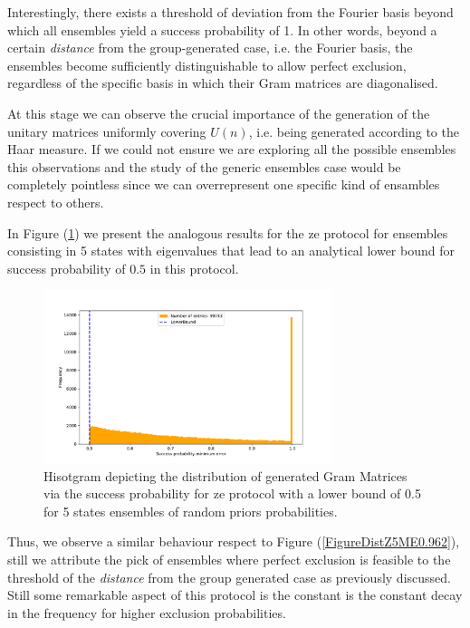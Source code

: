 \documentclass[12pt,letterpaper]{article}
\begin{document}
Interestingly, there exists a threshold of deviation from the Fourier basis beyond which all ensembles yield a success probability of 1. In other words, beyond a certain \emph{distance} from the group-generated case, i.e. the Fourier basis, the ensembles become sufficiently distinguishable to allow perfect exclusion, regardless of the specific basis in which their Gram matrices are diagonalised.

At this stage we can observe the crucial importance of the generation of the unitary matrices uniformly covering  $U(n)$, i.e. being generated according to the Haar measure. If we could not ensure we are exploring all the possible ensembles this observations and the study of the generic ensembles case would be completely pointless since we can overrepresent one specific kind of ensambles respect to others.

In Figure (\ref{FigureDistZ5ZE0.5}) we present the analogous results for the \gls{ze} protocol for ensembles consisting in 5 states with eigenvalues that lead to an analytical lower bound for success probability of $0.5$ in this protocol.

\begin{figure}[H]
	\centering
	\includegraphics[width=0.75\textwidth, trim={1.0cm 0.3cm 2.4cm 1.5cm}, clip]{../Plots/ExclusionZeroErrorRandomDistributionZ3Prob0.5.pdf}
	\caption{Hisotgram depicting the distribution of generated Gram Matrices via the success probability for \gls{ze} protocol with a lower bound of 0.5 for 5 states ensembles of random priors probabilities.}
	\label{FigureDistZ5ZE0.5}
\end{figure}

Thus, we observe a similar behaviour respect to Figure (\ref{FigureDistZ5ME0.962}), still we attribute the pick of ensembles where perfect exclusion is feasible to the threshold of the \emph{distance} from the group generated case as previously discussed. Still some remarkable aspect of this protocol is the constant is the constant decay in the frequency for higher exclusion probabilities.
\end{document}
